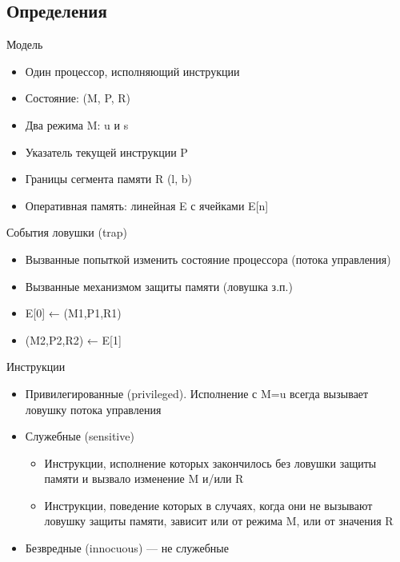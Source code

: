 \subsection{Определения}

\begin{frame}{Модель}

\begin{itemize}
\item Один процессор, исполняющий инструкции
\item Состояние: (M, P, R)
\item Два режима M: u и s
\item Указатель текущей инструкции P
\item Границы сегмента памяти R (l, b)
\item Оперативная память: линейная E с ячейками E[n]
\end{itemize}

\end{frame}

\begin{frame}{События ловушки (trap)}
\begin{itemize}
\item Вызванные попыткой изменить состояние
процессора (потока управления)
\item Вызванные механизмом защиты памяти (ловушка з.п.)

\item E[0] ← (M1,P1,R1)
\item (M2,P2,R2) ← E[1]
\end{itemize}

\end{frame}

\begin{frame}{Инструкции}
\begin{itemize}
    \item Привилегированные (privileged). Исполнение с M=u всегда вызывает ловушку потока управления
    \item Служебные (sensitive)
    \begin{itemize}
        \item Инструкции, исполнение которых закончилось без ловушки защиты памяти и вызвало изменение M и/или R
        \item Инструкции, поведение которых в случаях, когда они не вызывают ловушку защиты памяти, зависит или от режима M, или от значения R
    \end{itemize}
    \item Безвредные (innocuous) — не служебные
\end{itemize}
\end{frame}

